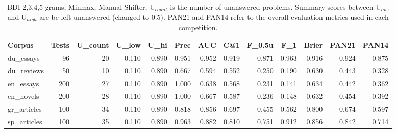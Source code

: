 \documentclass[
    hf
]{ceurart}
\begin{document}
\begin{table}
    \caption{BDI 2,3,4,5-grams, Minmax, Manual Shifter, U$_{count}$ is the number of unanswered
    problems. Summary scores between U$_{low}$ and U$_{high}$ are be left unanswered (changed to
    0.5). PAN21 and PAN14 refer to the overall evaluation metrics used in each competition.}
    \label{tab:bdi}
    \raggedright
    \begin{adjustbox}{max width=\textwidth}

        \begin{tabular}{lrrrrrrrrrrrr}
            \toprule
            Corpus & Tests & U_{count} & U_{low} & U_{hi} & Prec & AUC & C@1 & F_{0.5u} & F_1 & Brier & PAN21 & PAN14 \\
            \midrule
            du\_essays & 96 & 20 & 0.110 & 0.890 & 0.951 & 0.952 & 0.919 & 0.871 & 0.963 & 0.916 & 0.924 & 0.875 \\
            du\_reviews & 50 & 10 & 0.110 & 0.890 & 0.667 & 0.594 & 0.552 & 0.250 & 0.190 & 0.630 & 0.443 & 0.328 \\
            en\_essays & 200 & 27 & 0.110 & 0.890 & 1.000 & 0.638 & 0.568 & 0.231 & 0.141 & 0.634 & 0.442 & 0.362 \\
            en\_novels & 200 & 28 & 0.110 & 0.890 & 1.000 & 0.667 & 0.587 & 0.236 & 0.148 & 0.632 & 0.454 & 0.392 \\
            gr\_articles & 100 & 34 & 0.110 & 0.890 & 0.818 & 0.856 & 0.697 & 0.455 & 0.562 & 0.800 & 0.674 & 0.597 \\
            sp\_articles & 100 & 35 & 0.110 & 0.890 & 0.963 & 0.882 & 0.810 & 0.751 & 0.912 & 0.856 & 0.842 & 0.714 \\
            \bottomrule
            \end{tabular}
    \end{adjustbox}
\end{table}
\end{document}
